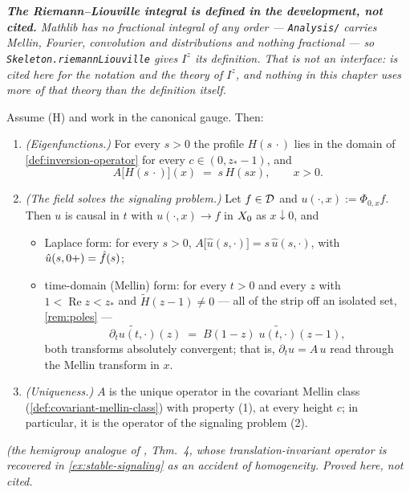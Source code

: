 \emph{\textbf{The Riemann--Liouville integral is defined in the development, not cited.} Mathlib
has no fractional integral of any order --- \texttt{Analysis/} carries Mellin, Fourier,
convolution and distributions and nothing fractional --- so \texttt{Skeleton.riemannLiouville}
gives $I^z$ its definition. That is not an interface:  is cited here
for the notation and the theory of $I^z$, and nothing in this chapter uses more of that theory
than the definition itself.}

\begin{theorem}\label{thm:signaling-form}
\leanok
Assume (H) and work in the canonical gauge. Then:
\begin{enumerate}
\item \emph{(Eigenfunctions.)} For every $s > 0$ the profile $H(s\,\cdot)$ lies in the domain
of \ref{def:inversion-operator} for every $c \in (0, z_*-1)$, and
\[
  A\bigl[H(s\,\cdot)\bigr](x) \;=\; s\, H(sx), \qquad x > 0 .
\]
\item \emph{(The field solves the signaling problem.)} Let $f \in \mathcal{D}$ and
$u(\cdot, x) := \Phi_{0,x} f$. Then $u$ is causal in $t$ with $u(\cdot, x) \to f$ in $X_0$ as
$x \downarrow 0$, and
\begin{itemize}
\item Laplace form: for every $s > 0$, $A\bigl[\hat u(s, \cdot)\bigr] = s\,\hat u(s, \cdot)$,
with $\hat u(s, 0{+}) = \hat f(s)$;
\item time-domain (Mellin) form: for every $t > 0$ and every $z$ with
$1 < \operatorname{Re} z < z_*$ and $\tilde H(z-1) \ne 0$ --- all of the strip off an isolated
set, \ref{rem:poles} ---
\[
  \widetilde{\partial_t u(t, \cdot)}(z) \;=\; B(1 - z)\;\widetilde{u(t, \cdot)}(z - 1),
\]
both transforms absolutely convergent; that is, $\partial_t u = A\,u$ read through the Mellin
transform in $x$.
\end{itemize}
\item \emph{(Uniqueness.)} $A$ is the unique operator in the covariant Mellin class
(\ref{def:covariant-mellin-class}) with property (1), at every height $c$; in particular, it is
the operator of the signaling problem (2).
\end{enumerate}
\statusT\quad\emph{(the hemigroup analogue of , Thm.~4, whose
translation-invariant operator is recovered in \ref{ex:stable-signaling} as an accident of
homogeneity. Proved here, not cited.}


\end{theorem}
